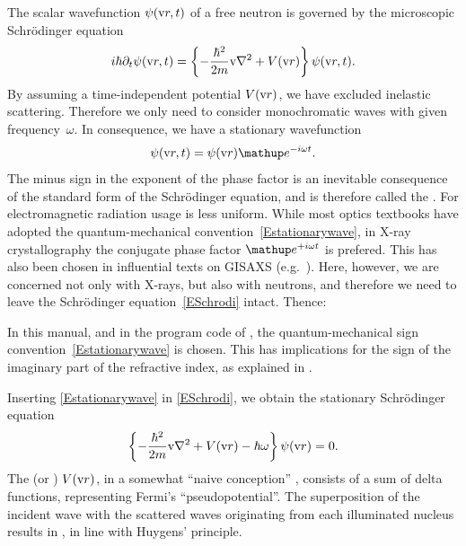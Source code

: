 %
The scalar wavefunction $\psi(\text{v}{r},t)$
%
%
%
of a free neutron
is governed by the microscopic Schrödinger equation
\begin{equation}\label{ESchrodi}
  i\hbar\partial_t \psi(\text{v}{r},t)
  = \left\{-\frac{\hbar^2}{2m}\text{v}{\nabla}^2+V(\text{v}{r})\right\} \psi(\text{v}{r},t).
\end{equation}
By assuming a time-independent potential $V(\text{v}{r})$,
we have excluded inelastic scattering.
Therefore we only need to consider monochromatic waves
with given frequency~$\omega$.
%
In consequence, we have a stationary wavefunction
\begin{equation}\label{Estationarywave}
  \psi(\r,t) = \psi(\r)\e^{-i\omega t}.
\end{equation}
%
The minus sign in the exponent of the phase factor
is an inevitable consequence of the standard form of the Schrödinger equation,
and is therefore called the .
%
%
%
For electromagnetic radiation
usage is less uniform.
While most optics textbooks
have adopted the quantum-mechanical convention~\cref{Estationarywave},
in X-ray crystallography
the conjugate phase factor $\e^{+i\omega t}$ is prefered.
This  has also been chosen
in influential texts on GISAXS (e.g.\ \cite{ReLL09}).
Here, however, we are concerned not only with X-rays,
but also with neutrons,
and therefore we need to leave the Schrödinger equation~\cref{ESchrodi} intact.
Thence:

\Note
{\indent In this manual, and in the program code of \BornAgain,
the quantum-mechanical sign convention~\cref{Estationarywave} is chosen.
This has implications for the sign of the imaginary part of the
refractive index,
%
as explained in .}

Inserting \cref{Estationarywave} in \cref{ESchrodi},
we obtain the stationary Schrödinger equation
\begin{equation}\label{EstatSchrodi}
  \left\{-\frac{\hbar^2}{2m}\text{v}{\nabla}^2+V(\text{v}{r})-\hbar\omega\right\} \psi(\text{v}{r}) = 0.
\end{equation}
%
%
%
%
The  (or )
 $V(\text{v}{r})$,
in a somewhat ``naive conception'' \cite[p.~7]{Sea89},
consists of a sum of delta functions,
representing Fermi's ``pseudopotential''.
%
The superposition of the incident wave with the scattered waves
originating from each illuminated nucleus
results in ,
%
in line with Huygens' principle.
%

